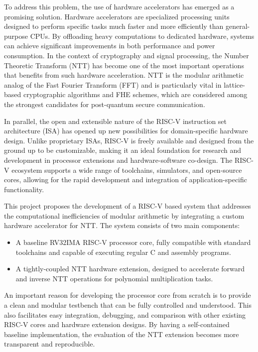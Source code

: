 \documentclass[a4paper, 12pt, titlepage]{article}
\begin{document}
To address this problem, the use of hardware accelerators has emerged as a promising solution. Hardware accelerators are specialized processing units designed to perform specific tasks much faster and more efficiently than general-purpose CPUs. By offloading heavy computations to dedicated hardware, systems can achieve significant improvements in both performance and power consumption. In the context of cryptography and signal processing, the Number Theoretic Transform (NTT) has become one of the most important operations that benefits from such hardware acceleration. NTT is the modular arithmetic analog of the Fast Fourier Transform (FFT) and is particularly vital in lattice-based cryptographic algorithms and FHE schemes, which are considered among the strongest candidates for post-quantum secure communication.

In parallel, the open and extensible nature of the RISC-V instruction set architecture (ISA) has opened up new possibilities for domain-specific hardware design. Unlike proprietary ISAs, RISC-V is freely available and designed from the ground up to be customizable, making it an ideal foundation for research and development in processor extensions and hardware-software co-design. The RISC-V ecosystem supports a wide range of toolchains, simulators, and open-source cores, allowing for the rapid development and integration of application-specific functionality.

This project proposes the development of a RISC-V based system that addresses the computational inefficiencies of modular arithmetic by integrating a custom hardware accelerator for NTT. The system consists of two main components:

\begin{itemize}
    \item  A baseline RV32IMA RISC-V processor core, fully compatible with standard toolchains and capable of executing regular C and assembly programs.
    \item A tightly-coupled NTT hardware extension, designed to accelerate forward and inverse NTT operations for polynomial multiplication tasks.
\end{itemize}

An important reason for developing the processor core from scratch is to provide a clean and modular testbench that can be fully controlled and understood. This also facilitates easy integration, debugging, and comparison with other existing RISC-V cores and hardware extension designs. By having a self-contained baseline implementation, the evaluation of the NTT extension becomes more transparent and reproducible.
\end{document}
